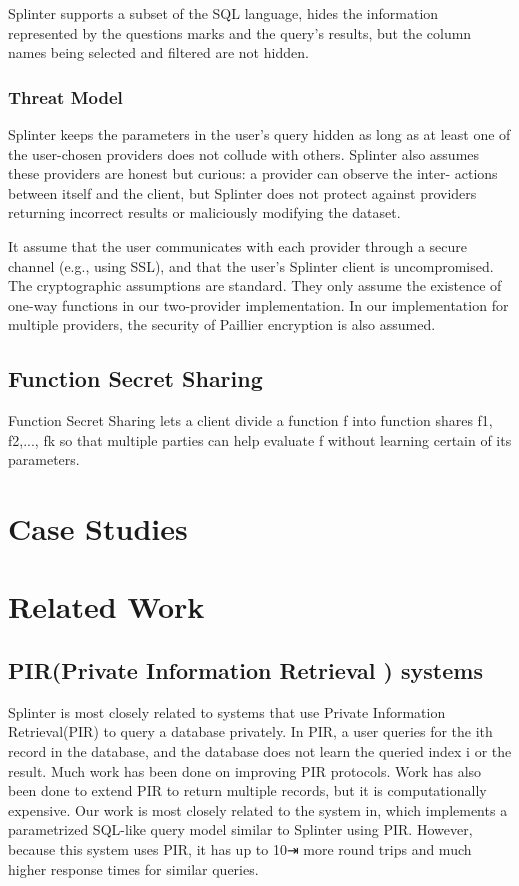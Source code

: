 \documentclass[12pt,a4paper]{article}
\begin{document}
\begin{multicols}{2}
Splinter supports a subset of the SQL language, 
hides the information represented by the questions 
marks and the query’s results, but the column names 
being selected and filtered are not hidden.
\subsubsection{Threat Model}
Splinter keeps the parameters in the user’s query 
hidden as long as at least one of the user-chosen 
providers does not collude with others. Splinter 
also assumes these providers are honest but 
curious: a provider can observe the inter- actions 
between itself and the client, but Splinter does 
not protect against providers returning incorrect 
results or maliciously modifying the dataset.

It assume that the user communicates with each 
provider through a secure channel (e.g., using 
SSL), and that the user’s Splinter client is 
uncompromised. The cryptographic assumptions are 
standard. They only assume the existence of one-way 
functions in our two-provider implementation. In 
our implementation for multiple providers, the 
security of Paillier encryption is also 
assumed.
\subsection{Function Secret Sharing}
Function Secret Sharing lets a client divide a function f into function shares f1, f2,..., fk so that multiple parties can help evaluate f without learning certain of its parameters.
\section{Case Studies}
\section{Related Work}
\subsection{PIR(Private Information Retrieval ) 
systems}
Splinter is most closely related to systems that 
use Private Information Retrieval(PIR) to query a 
database privately. In PIR, a user queries for the 
ith record in the database, and the database does 
not learn the queried index i or the result. Much 
work has been done on improving PIR protocols. Work 
has also been done to extend PIR to return multiple 
records, but it is computationally expensive. Our 
work is most closely related to the system in, 
which implements a parametrized SQL-like query 
model similar to Splinter using PIR. However, 
because this system uses PIR, it has up to 10⇥ more 
round trips and much higher response times for 
similar queries.


\end{multicols}
\end{document}
